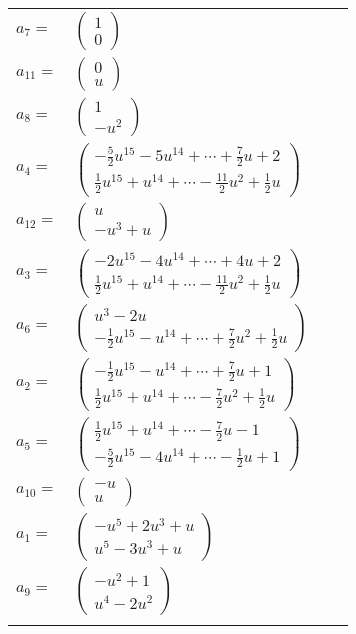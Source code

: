 \documentclass[1p]{elsarticle_modified}
\theoremstyle{definition}
\begin{document}
\begin{tabular}{m{7pt} m{180pt} m{7pt} m{180pt} }
\flushright $a_{7}=$&$\begin{pmatrix}1\\0\end{pmatrix}$ \\
\flushright $a_{11}=$&$\begin{pmatrix}0\\u\end{pmatrix}$ \\
\flushright $a_{8}=$&$\begin{pmatrix}1\\- u^2\end{pmatrix}$ \\
\flushright $a_{4}=$&$\begin{pmatrix}-\frac{5}{2} u^{15}-5 u^{14}+\cdots+\frac{7}{2} u+2\\\frac{1}{2} u^{15}+u^{14}+\cdots-\frac{11}{2} u^2+\frac{1}{2} u\end{pmatrix}$ \\
\flushright $a_{12}=$&$\begin{pmatrix}u\\- u^3+u\end{pmatrix}$ \\
\flushright $a_{3}=$&$\begin{pmatrix}-2 u^{15}-4 u^{14}+\cdots+4 u+2\\\frac{1}{2} u^{15}+u^{14}+\cdots-\frac{11}{2} u^2+\frac{1}{2} u\end{pmatrix}$ \\
\flushright $a_{6}=$&$\begin{pmatrix}u^3-2 u\\-\frac{1}{2} u^{15}- u^{14}+\cdots+\frac{7}{2} u^2+\frac{1}{2} u\end{pmatrix}$ \\
\flushright $a_{2}=$&$\begin{pmatrix}-\frac{1}{2} u^{15}- u^{14}+\cdots+\frac{7}{2} u+1\\\frac{1}{2} u^{15}+u^{14}+\cdots-\frac{7}{2} u^2+\frac{1}{2} u\end{pmatrix}$ \\
\flushright $a_{5}=$&$\begin{pmatrix}\frac{1}{2} u^{15}+u^{14}+\cdots-\frac{7}{2} u-1\\-\frac{5}{2} u^{15}-4 u^{14}+\cdots-\frac{1}{2} u+1\end{pmatrix}$ \\
\flushright $a_{10}=$&$\begin{pmatrix}- u\\u\end{pmatrix}$ \\
\flushright $a_{1}=$&$\begin{pmatrix}- u^5+2 u^3+u\\u^5-3 u^3+u\end{pmatrix}$ \\
\flushright $a_{9}=$&$\begin{pmatrix}- u^2+1\\u^4-2 u^2\end{pmatrix}$\\&\end{tabular}
\end{document}
